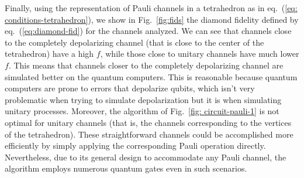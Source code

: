 \documentclass[10pt,letterpaper]{article} %
\newcommand{\fref}[1]{Fig.~\ref{#1}}
\newcommand{\eref}[1]{eq.~(\ref{#1})}
\begin{document}
Finally, using the representation of Pauli channels in a tetrahedron as
in \eref{eq: conditions-tetrahedron},
we show in \fref{fig:fids} the diamond fidelity defined by \eref{eq:diamond-fid} for the channels
analyzed. 
We can see that channels close to the 
completely depolarizing
channel (that is close to the center of the tetrahedron)
have a high $f$, while those 
close to unitary channels have much lower $f$.
This means that channels closer to the 
completely depolarizing channel are simulated better on the quantum computers.
This is reasonable because quantum computers are prone to errors
that depolarize qubits, which isn't very problematic
when trying to simulate depolarization but it is 
when simulating unitary processes. 
{\color{orange} Moreover, the algorithm of \fref{fig: circuit-pauli-1} is not optimal for unitary channels 
(that is, the channels corresponding to the vertices of the tetrahedron). 
These straightforward channels could be accomplished more efficiently by simply applying the corresponding Pauli operation directly. Nevertheless, due to its general design to accommodate any Pauli channel, the algorithm employs numerous quantum gates even in such scenarios.}
\end{document}
